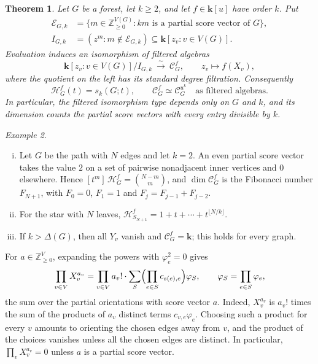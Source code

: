 \documentclass[reqno]{article}
\theoremstyle{plain} %
\newtheorem{theorem}{Theorem}[section]
\theoremstyle{definition}
\theoremstyle{remark}
\newtheorem{example}[theorem]{\sc Example}
\newcommand{\Z}{{\mathbb{Z}}}
\newcommand{\K} {\mathbf{k}}
\newcommand {\CC}{\mathscr{C}}
\newcommand{\hs}{\mathscr{H}}
\numberwithin{equation}{section}
\begin{document}
\begin{theorem}\label{thm:degenerate-forests}
Let $G$ be a forest, let $k\ge2$, and let $f\in\K[u]$ have order $k$.
Put
\[
 \begin{aligned}
 \mathcal E_{G,k}&=\{m\in\Z_{\ge0}^{V(G)}:km\text{ is a partial score vector of }G\},\\
 I_{G,k}&=(z^m:m\notin\mathcal E_{G,k})\subseteq\K[z_v:v\in V(G)].
 \end{aligned}
\]
Evaluation induces an isomorphism of filtered algebras
\begin{equation}\label{eq:degenerate-forest-presentation}
 \K[z_v:v\in V(G)]/I_{G,k}\ \xrightarrow{\ \sim\ }\ \CC_G^f,
 \qquad z_v\longmapsto f(X_v),
\end{equation}
where the quotient on the left has its standard degree filtration.
Consequently
\[
 \hs_G^f(t)=s_k(G;t),\qquad
 \CC_G^f\simeq\CC_G^{u^k}\quad\text{as filtered algebras}.
\]
In particular, the filtered isomorphism type depends only on $G$ and
$k$, and its dimension counts the partial score vectors with every
entry divisible by $k$.
\end{theorem}

\begin{example}\label{ex:degenerate-examples}
\leavevmode
\begin{enumerate}[(i)]
\item Let $G$ be the path with $N$ edges and let $k=2$. An even partial
score vector takes the value $2$ on a set of pairwise nonadjacent inner
vertices and $0$ elsewhere. Hence $[t^m]\,\hs_G^f=\binom{N-m}{m}$, and
$\dim\CC_G^f$ is the Fibonacci number $F_{N+1}$, with $F_0=0$, $F_1=1$ and
$F_j=F_{j-1}+F_{j-2}$.
\item For the star with $N$ leaves,
$\hs_{S_{N+1}}^f=1+t+\cdots+t^{\lfloor N/k\rfloor}$.
\item If $k>\Delta(G)$, then all $Y_v$ vanish and $\CC_G^f=\K$; this
holds for every graph.
\end{enumerate}
\end{example}

For $a\in\Z_{\ge0}^V$, expanding the powers with $\varphi_e^2=0$ gives
\begin{equation}\label{eq:power-products}
 \prod_{v\in V}X_v^{a_v}=\prod_{v\in V}a_v!\cdot
 \sum_{S}\Bigl(\prod_{e\in S}c_{s(e),e}\Bigr)\varphi_S,
 \qquad \varphi_S=\prod_{e\in S}\varphi_e,
\end{equation}
the sum over the partial orientations with score vector $a$. Indeed,
$X_v^{a_v}$ is $a_v!$ times the sum of the products of $a_v$ distinct
terms $c_{v,e}\varphi_e$. Choosing such a product for every $v$ amounts
to orienting the chosen edges away from $v$, and the product of the
choices vanishes unless all the chosen edges are distinct. In particular,
$\prod_vX_v^{a_v}=0$ unless $a$ is a partial score vector.
\end{document}
